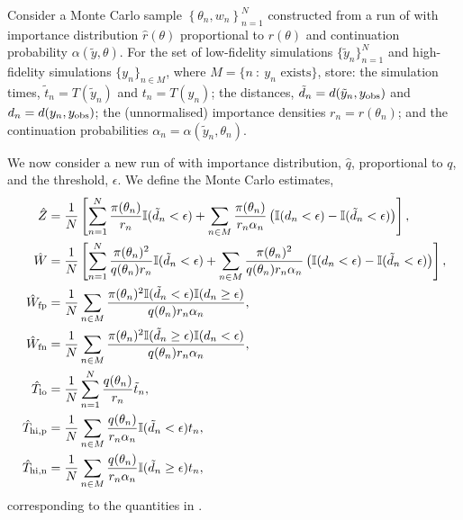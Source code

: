 \documentclass[review]{siamonline190516}
\begin{document}
\begin{definition}
\label{def:MonteCarlo}
Consider a Monte Carlo sample $\left\{ \theta_n, w_n \right\}_{n=1}^{N}$ constructed from a run of  with importance distribution $\hat r(\theta)$ proportional to $r(\theta)$ and continuation probability $\alpha(\tilde y, \theta)$.
For the set of low-fidelity simulations $\{ \tilde y_n \}_{n=1}^{N}$ and high-fidelity simulations $\{ y_n \}_{n \in M}$, where $M = \{ n~:~ y_n \text{ exists} \}$, store: the simulation times, $\tilde t_n = T(\tilde y_n)$ and $t_n = T(y_n)$; the distances, $\tilde d_n = d(\tilde y_n, y_{\mathrm{obs}})$ and $d_n = d(y_n, y_{\mathrm{obs}})$; the (unnormalised) importance densities $r_n = r(\theta_n)$; and the continuation probabilities $\alpha_n = \alpha(\tilde y_n, \theta_n)$.

We now consider a new run of  with importance distribution, $\hat q$, proportional to $q$, and the threshold, $\epsilon$.
We define the Monte Carlo estimates,
\begin{subequations}
\label{eq:MonteCarlo}
\begin{align}
 \hat Z &= \frac{1}{N} \left[ \sum_{n=1}^N \frac{\pi(\theta_n)}{r_n} \mathbb I(\tilde d_n < \epsilon) + \sum_{n \in M} \frac{\pi(\theta_n)}{r_n \alpha_n} \left( \mathbb I(d_n < \epsilon) - \mathbb I(\tilde d_n < \epsilon)\right) \right]
 \label{eq:Zhat}
, \\
 \hat{W} &= \frac{1}{N} \left[ \sum_{n=1}^N \frac{\pi(\theta_n)^2}{q(\theta_n) r_n} \mathbb I(\tilde d_n < \epsilon) + \sum_{n \in M} \frac{\pi(\theta_n)^2}{q(\theta_n) r_n \alpha_n} \left( \mathbb I(d_n < \epsilon) - \mathbb I(\tilde d_n < \epsilon)\right) \right]
 \label{eq:MC_tpfn}
, \\ \fp{\hat{W}} &= \frac{1}{N} \sum_{n \in M} \frac{ \pi(\theta_n)^2  \mathbb I (\tilde d_n < \epsilon) \mathbb I (d_n \geq \epsilon)}{q(\theta_n) r_n \alpha_n}
 \label{eq:MC_fp}
, \\ \fn{\hat{W}} &= \frac{1}{N} \sum_{n \in M} \frac{ \pi(\theta_n)^2 \mathbb I (\tilde d_n \geq \epsilon) \mathbb I (d_n < \epsilon)}{q(\theta_n) r_n \alpha _n} 
 \label{eq:MC_fn}
, \\ \hat T_{\mathrm{lo}} &= \frac{1}{N} \sum_{n=1}^{N} \frac{q(\theta_n)}{r_n} \tilde t_n
 \label{eq:T_lo}
, \\ \hat T_{\mathrm{hi}, \mathrm p} &= \frac{1}{N} \sum_{n \in M} \frac{q(\theta_n)}{r_n \alpha_n} \mathbb I(\tilde d_n < \epsilon) t_n
 \label{eq:T_hi_p}
, \\ \hat T_{\mathrm{hi}, \mathrm n} &= \frac{1}{N} \sum_{n \in M} \frac{q(\theta_n)}{r_n \alpha_n} \mathbb I(\tilde d_n \geq \epsilon) t_n
 \label{eq:T_hi_n}
,
\end{align}
\end{subequations}
corresponding to the quantities in .
\end{definition}
\end{document}
